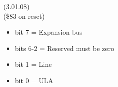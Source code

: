  (3.01.08)\\
(\$83 on reset)
\begin{itemize}
\item bit 7 = Expansion bus 
\item bits 6-2 = Reserved must be zero
\item bit 1 = Line
\item bit 0 = ULA
\end{itemize}
